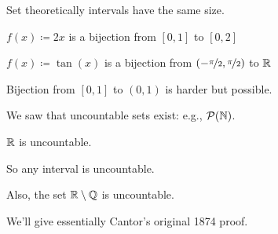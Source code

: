 \documentclass[10pt,aspectratio=149]{beamer}
\begin{document}
\begin{frame}
Set theoretically intervals have the same size.

\medskip
\pause

$f(x)\coloneqq 2x$ is a bijection from $[0,1]$ to $[0,2]$

\medskip
\pause

$f(x) \coloneqq \tan(x)$ is a bijection from $(-\nicefrac{\pi}{2},\nicefrac{\pi}{2})$ to ${\mathbb{R}}$

\medskip
\pause

Bijection from $[0,1]$ to $(0,1)$ is harder but possible.

\medskip
\pause

We saw that uncountable sets exist: e.g., ${\mathcal{P}}({\mathbb{N}})$.

\pause

\begin{theorem}[Cantor]
${\mathbb{R}}$ is uncountable.
\end{theorem}

\pause

So any interval is uncountable.

\medskip
\pause

Also, the set ${\mathbb{R}} \setminus {\mathbb{Q}}$ is uncountable.

\medskip
\pause

We'll give essentially Cantor's original 1874 proof.

\end{frame}
\end{document}

